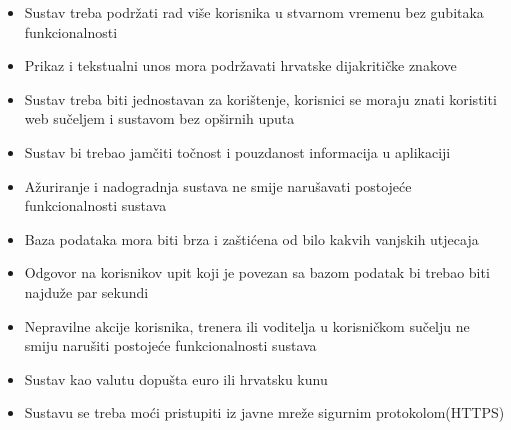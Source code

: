 			\begin{itemize}
	        	\item 	Sustav treba podržati rad više korisnika u stvarnom vremenu bez gubitaka funkcionalnosti
	        	\item 	Prikaz i tekstualni unos mora podržavati hrvatske dijakritičke znakove
	        	\item 	Sustav treba biti jednostavan za korištenje, korisnici se moraju znati koristiti web sučeljem i sustavom bez opširnih uputa 
	        	\item 	Sustav bi trebao jamčiti točnost i pouzdanost informacija u aplikaciji
	        	\item 	Ažuriranje i nadogradnja sustava ne smije narušavati postojeće funkcionalnosti sustava
	        	\item 	Baza podataka mora biti brza i zaštićena od bilo kakvih vanjskih utjecaja
	        	\item 	Odgovor na korisnikov upit koji je povezan sa bazom podatak bi trebao biti najduže par sekundi
	        	\item 	Nepravilne akcije korisnika, trenera ili voditelja u korisničkom sučelju ne smiju narušiti postojeće funkcionalnosti sustava
	        	\item 	Sustav kao valutu dopušta euro ili hrvatsku kunu
	        	\item 	Sustavu se treba moći pristupiti iz javne mreže sigurnim protokolom(HTTPS)
        	\end{itemize}
			 
			 
			 
	